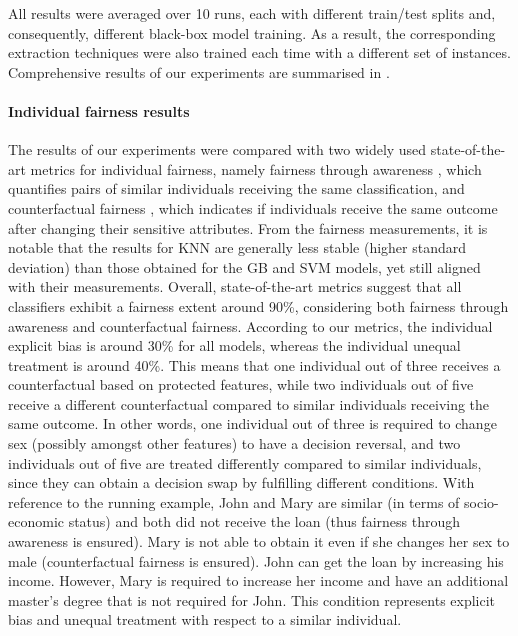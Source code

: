 \documentclass[letterpaper]{article} %
\begin{document}
All results were averaged over 10 runs, each with different train/test splits and, consequently, different black-box model training.
%
As a result, the corresponding extraction techniques were also trained each time with a different set of instances.
%
Comprehensive results of our experiments are summarised in .

\paragraph{Individual fairness results}
The results of our experiments were compared with two widely used state-of-the-art metrics for individual fairness, namely fairness through awareness \cite{10.1145/2090236.2090255}, which quantifies pairs of similar individuals receiving the same classification, and counterfactual fairness \cite{NIPS2017_a486cd07}, which indicates if individuals receive the same outcome after changing their sensitive attributes.
%
From the fairness measurements, it is notable that the results for KNN are generally less stable (higher standard deviation) than those obtained for the GB and SVM models, yet still aligned with their measurements.
%
Overall, state-of-the-art metrics suggest that all classifiers exhibit a fairness extent around 90\%, considering both fairness through awareness and counterfactual fairness.
%
According to our metrics, the individual explicit bias is around 30\% for all models, whereas the individual unequal treatment is around 40\%.
%
This means that one individual out of three receives a counterfactual based on protected features, while two individuals out of five receive a different counterfactual compared to similar individuals receiving the same outcome.
%
In other words, one individual out of three is required to change sex (possibly amongst other features) to have a decision reversal, and two individuals out of five are treated differently compared to similar individuals, since they can obtain a decision swap by fulfilling different conditions.
%
With reference to the running example, John and Mary are similar (in terms of socio-economic status) and both did not receive the loan (thus fairness through awareness is ensured). Mary is not able to obtain it even if she changes her sex to male (counterfactual fairness is ensured). John can get the loan by increasing his income. However, Mary is required to increase her income and have an additional master’s degree that is not required for John. This condition represents explicit bias and unequal treatment with respect to a similar individual.
\end{document}

